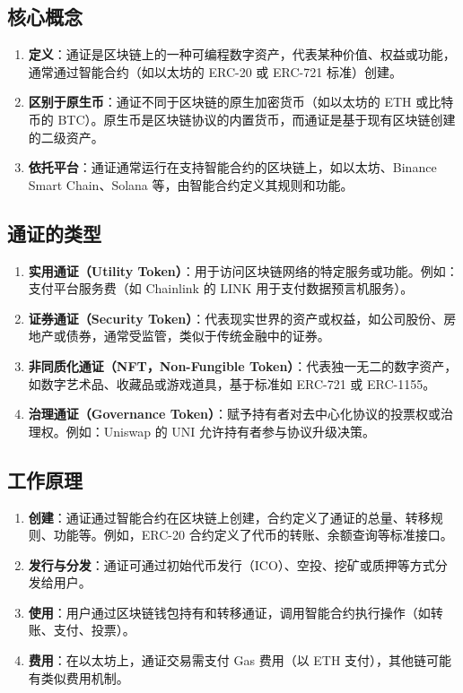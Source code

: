 \documentclass[12pt]{ctexart}
\begin{document}
\subsection{核心概念}
\begin{enumerate}
    \item \textbf{定义}：通证是区块链上的一种可编程数字资产，代表某种价值、权益或功能，通常通过智能合约（如以太坊的 ERC-20 或 ERC-721 标准）创建。
    \item \textbf{区别于原生币}：通证不同于区块链的原生加密货币（如以太坊的 ETH 或比特币的 BTC）。原生币是区块链协议的内置货币，而通证是基于现有区块链创建的二级资产。
    \item \textbf{依托平台}：通证通常运行在支持智能合约的区块链上，如以太坊、Binance Smart Chain、Solana 等，由智能合约定义其规则和功能。
\end{enumerate}

\subsection{通证的类型}
\begin{enumerate}
    \item \textbf{实用通证（Utility Token）}：用于访问区块链网络的特定服务或功能。例如：支付平台服务费（如 Chainlink 的 LINK 用于支付数据预言机服务）。
    \item \textbf{证券通证（Security Token）}：代表现实世界的资产或权益，如公司股份、房地产或债券，通常受监管，类似于传统金融中的证券。
    \item \textbf{非同质化通证（NFT，Non-Fungible Token）}：代表独一无二的数字资产，如数字艺术品、收藏品或游戏道具，基于标准如 ERC-721 或 ERC-1155。
    \item \textbf{治理通证（Governance Token）}：赋予持有者对去中心化协议的投票权或治理权。例如：Uniswap 的 UNI 允许持有者参与协议升级决策。
\end{enumerate}

\subsection{工作原理}
\begin{enumerate}
    \item \textbf{创建}：通证通过智能合约在区块链上创建，合约定义了通证的总量、转移规则、功能等。例如，ERC-20 合约定义了代币的转账、余额查询等标准接口。
    \item \textbf{发行与分发}：通证可通过初始代币发行（ICO）、空投、挖矿或质押等方式分发给用户。
    \item \textbf{使用}：用户通过区块链钱包持有和转移通证，调用智能合约执行操作（如转账、支付、投票）。
    \item \textbf{费用}：在以太坊上，通证交易需支付 Gas 费用（以 ETH 支付），其他链可能有类似费用机制。
\end{enumerate}
\end{document}
